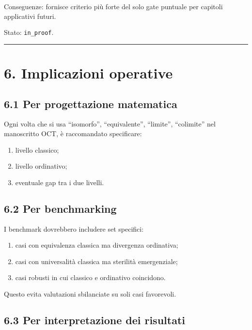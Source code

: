 Conseguenze:
fornisce criterio più forte del solo gate puntuale per capitoli applicativi futuri.

Stato: \texttt{in\_proof}.

\begin{center}\rule{0.5\linewidth}{0.5pt}\end{center}

\section{6. Implicazioni operative}

\subsection{6.1 Per progettazione matematica}

Ogni volta che si usa ``isomorfo'', ``equivalente'', ``limite'', ``colimite'' nel manoscritto OCT, è raccomandato specificare:

\begin{enumerate}
\def\labelenumi{\arabic{enumi}.}
\tightlist
\item
  livello classico;
\item
  livello ordinativo;
\item
  eventuale gap tra i due livelli.
\end{enumerate}

\subsection{6.2 Per benchmarking}

I benchmark dovrebbero includere set specifici:

\begin{enumerate}
\def\labelenumi{\arabic{enumi}.}
\tightlist
\item
  casi con equivalenza classica ma divergenza ordinativa;
\item
  casi con universalità classica ma sterilità emergenziale;
\item
  casi robusti in cui classico e ordinativo coincidono.
\end{enumerate}

Questo evita valutazioni sbilanciate su soli casi favorevoli.

\subsection{6.3 Per interpretazione dei risultati}

